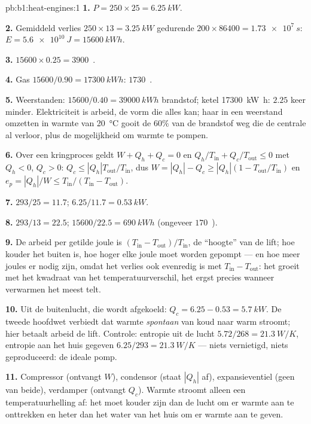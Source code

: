 \begin{solution}{pb:b1:heat-engines:1}
\textbf{1.} $P = 250 \times 25 = \qty{6.25}{kW}$.

\textbf{2.} Gemiddeld verlies $250 \times 13 = \qty{3.25}{kW}$ gedurende $200 \times 86400 =
\qty{1.73e7}{s}$: $E = \qty{5.6e10}{J} = \qty{15600}{kW h}$.

\textbf{3.} $15600 \times 0.25 = 3900$~\texteuro.

\textbf{4.} Gas $15600/0.90 = \qty{17300}{kW h}$: $1730$~\texteuro.

\textbf{5.} Weerstanden: $15600/0.40 = \qty{39000}{kW h}$ brandstof; ketel
\qty{17300}{kW h}: $2.25$ keer minder. Elektriciteit is arbeid, de vorm die
alles kan; haar in een weerstand omzetten in warmte van \qty{20}{\degreeCelsius}
gooit de $60\%$ van de brandstof weg die de centrale al verloor, plus de
mogelijkheid om warmte te pompen.

\textbf{6.} Over een kringproces geldt $W + Q_h + Q_c = 0$ en $Q_h/T_{\mathrm{in}} +
Q_c/T_{\mathrm{out}} \leq 0$ met $Q_h < 0$, $Q_c > 0$: $Q_c \leq
|Q_h|T_{\mathrm{out}}/T_{\mathrm{in}}$, dus $W = |Q_h| - Q_c \geq |Q_h|(1 -
T_{\mathrm{out}}/T_{\mathrm{in}})$ en $e_p = |Q_h|/W \leq T_{\mathrm{in}}/(T_{\mathrm{in}} -
T_{\mathrm{out}})$.

\textbf{7.} $293/25 = 11.7$; $6.25/11.7 = \qty{0.53}{kW}$.

\textbf{8.} $293/13 = 22.5$; $15600/22.5 = \qty{690}{kW h}$ (ongeveer
$170$~\texteuro).

\textbf{9.} De arbeid per getilde joule is $(T_{\mathrm{in}} - T_{\mathrm{out}})/
T_{\mathrm{in}}$, de ``hoogte'' van de lift; hoe kouder het buiten is, hoe
hoger elke joule moet worden gepompt --- en hoe meer joules er nodig zijn, omdat
het verlies ook evenredig is met $T_{\mathrm{in}} - T_{\mathrm{out}}$: het
 groeit met het kwadraat van het temperatuurverschil, het ergst
precies wanneer verwarmen het meest telt.

\textbf{10.} Uit de buitenlucht, die wordt afgekoeld: $Q_c = 6.25 - 0.53 =
\qty{5.7}{kW}$. De tweede hoofdwet verbiedt dat warmte \emph{spontaan}
van koud naar warm stroomt; hier betaalt arbeid de lift. Controle: entropie uit de
lucht $5.72/268 = \qty{21.3}{W/K}$, entropie aan het huis gegeven $6.25/293 =
\qty{21.3}{W/K}$ --- niets vernietigd, niets geproduceerd: de ideale pomp.

\textbf{11.} Compressor (ontvangt $W$), condensor (staat $|Q_h|$ af),
expansieventiel (geen van beide), verdamper (ontvangt $Q_c$). Warmte stroomt alleen
een temperatuurhelling af: het  moet kouder zijn dan de lucht om
er warmte aan te onttrekken en heter dan het water van het huis om er warmte aan te geven.


\end{solution}
